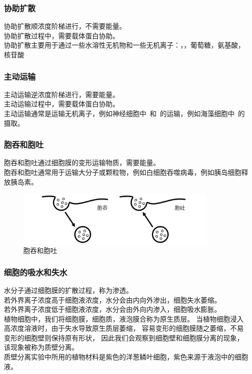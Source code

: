 \documentclass[UTF8]{ctexart}
\begin{document}
\subsubsection{协助扩散}
    协助扩散顺浓度阶梯进行，不需要能量。\\[2mm]
    协助扩散过程中，需要载体蛋白协助。\\[2mm]
    协助扩散主要用于通过一些水溶性无机物和一些无机离子：，，葡萄糖，氨基酸，核苷酸

\subsubsection{主动运输}
    主动运输逆浓度阶梯进行，需要能量。\\[2mm]
    主动运输过程中，需要载体蛋白协助。\\[2mm]
    主动运输通常是运输无机离子，例如神经细胞中~和~的运输，例如海藻细胞中~的摄取。

\subsubsection{胞吞和胞吐}
    胞吞和胞吐通过细胞膜的变形运输物质，需要能量。\\[2mm]
    胞吞和胞吐通常用于运输大分子或颗粒物，例如白细胞吞噬病毒，例如胰岛细胞释放胰岛素。\vspace{10pt}
    \begin{figure}[h!]
        \begin{center}
            \includegraphics[width=10cm]{BiologyImage/3.jpg}
            \caption{胞吞和胞吐}
       \end{center}
    \end{figure}


\newpage
    
\subsubsection{细胞的吸水和失水}
    水分子通过细胞膜的扩散过程，称为渗透。\\[3mm]
    若外界离子浓度高于细胞液浓度，水分会由内向外渗出，细胞失水萎缩。\\[3mm]
    若外界离子浓度低于细胞液浓度，水分会由外向内渗入，细胞吸水膨胀。\\[3mm]
    植物细胞中，我们将细胞膜，细胞质，液泡膜合称为原生质层。
    当植物细胞浸入高浓度溶液时，由于失水导致原生质层萎缩，
    容易变形的细胞膜随之萎缩，不易变形的细胞壁则保持原有形状，
    因此我们会观察到细胞壁和细胞膜分离的现象，该现象被称为质壁分离。\\[3mm]
    质壁分离实验中所用的植物材料是紫色的洋葱鳞叶细胞，紫色来源于液泡中的细胞液。
    
\end{document}
